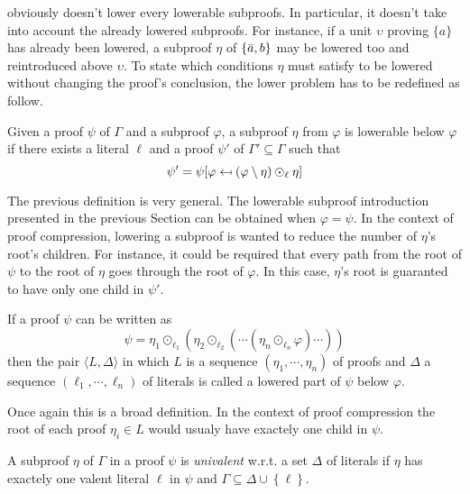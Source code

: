 \documentclass{llncs}
\begin{document}
{\LowerUnits} obviously doesn't lower every lowerable subproofs. In particular, it doesn't take into
account the already lowered subproofs. For instance, if a unit $\upsilon$ proving $\{a\}$ has
already been lowered, a subproof $\eta$ of $\{\bar{a},b\}$ may be lowered too and reintroduced
above $\upsilon$. To state which conditions $\eta$ must satisfy to be lowered without changing the
proof's conclusion, the lower problem has to be redefined as follow.

\begin{definition}
Given a proof $\psi$ of $\Gamma$ and a subproof $\varphi$, a subproof $\eta$ from $\varphi$ is lowerable
below $\varphi$ if there exists a literal $\ell$ and a proof $\psi'$ of $\Gamma' \subseteq
\Gamma$ such that
\begin{equation}
  \psi' = \psi[\varphi \mapsfrom \left(\varphi \setminus \eta\right) \odot_\ell \eta]
\end{equation}
\end{definition}
The previous definition is very general. The lowerable subproof introduction presented in the
previous Section can be obtained when $\varphi = \psi$. In the context of proof compression,
lowering a subproof is wanted to reduce the number of $\eta$'s root's children. For instance, it
could be required that every path from the root of $\psi$ to the root of $\eta$ goes through the
root of $\varphi$. In this case, $\eta$'s root is guaranted to have only one child in $\psi'$.

\begin{definition}
If a proof $\psi$ can be written as
\begin{equation}
  \psi = \eta_1 \odot_{\ell_1} ( \eta_2 \odot_{\ell_2} ( \cdots (\eta_n \odot_{\ell_n} \varphi)
          \cdots ))
\end{equation}
then the pair $\langle L,\Delta \rangle$ in which $L$ is a sequence $(\eta_1,\cdots,\eta_n)$ of
proofs and $\Delta$ a sequence $(\ell_1,\cdots,\ell_n)$ of literals is called a lowered part of $\psi$
below $\varphi$.
\end{definition}
Once again this is a broad definition. In the context of proof compression the root of each proof
$\eta_i \in L$ would usualy have exactely one child in $\psi$.

\begin{definition}
A subproof $\eta$ of $\Gamma$ in a proof $\psi$ is \emph{univalent} w.r.t. a set $\Delta$ of literals if $\eta$ has
exactely one valent literal $\ell$ in $\psi$ and $\Gamma \subseteq \Delta \cup \left\{ \ell
\right\}$.
\end{definition}
\end{document}
